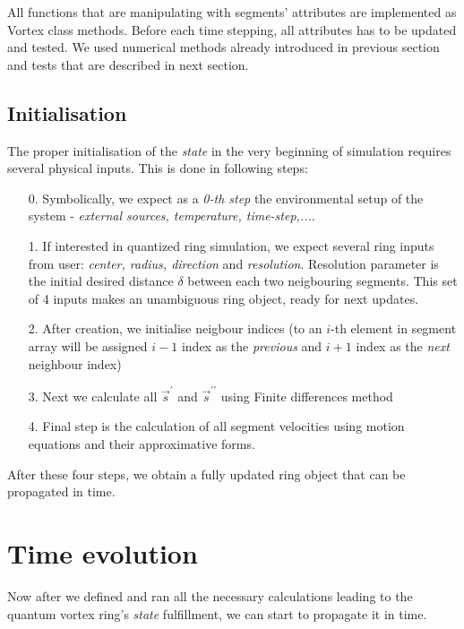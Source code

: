 All functions that are manipulating with segments' attributes are implemented as Vortex class methods. Before each time stepping, all attributes has to be updated and tested. We used numerical methods already introduced in previous section and tests that are described in next section.

\subsection*{Initialisation}

The proper initialisation of the \textit{state} in the very beginning of simulation requires several physical inputs. This is done in following steps:
\begin{itemize}
	\item[0.] Symbolically, we expect as a \textit{0-th step} the environmental setup of the system - \textit{external sources, temperature, time-step,...}.

	\item[1.] If interested in quantized ring simulation, we expect several ring inputs from user: \textit{center, radius, direction} and \textit{resolution}.
	Resolution parameter is the initial desired distance $\delta$ between each two neigbouring segments. This set of 4 inputs makes an unambiguous ring object, ready for next updates.

	\item[2.] After creation, we initialise neigbour indices (to an $i$-th element in segment array will be assigned $i-1$ index as the \textit{previous} and $i+1$ index as the \textit{next} neighbour index)
	\item[3.] Next we calculate all $\vec{s}^{\prime}$ and $\vec{s}^{\prime\prime}$ using Finite differences method
	\item[4.] Final step is the calculation of all segment velocities using motion equations and their approximative forms.
\end{itemize}

After these four steps, we obtain a fully updated ring object that can be propagated in time.

\newpage

\section{Time evolution}

Now after we defined and ran all the necessary calculations leading to the quantum vortex ring's \textit{state} fulfillment, we can start to propagate it in time.

